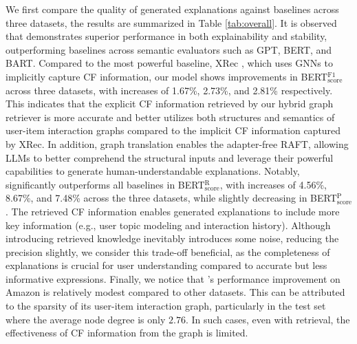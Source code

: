 We first compare the quality of generated explanations against baselines across three datasets, the results are summarized in Table \ref{tab:overall}. It is observed that \model demonstrates superior performance in both explainability and stability, outperforming baselines across semantic evaluators such as GPT, BERT, and BART. Compared to the most powerful baseline, XRec \cite{ma2024xrec}, which uses GNNs to implicitly capture CF information, our model shows improvements in BERT${_\text{score}^\text{F1}}$ across three datasets, with increases of 1.67\%, 2.73\%, and 2.81\% respectively. This indicates that the explicit CF information retrieved by our hybrid graph retriever is more accurate and better utilizes both structures and semantics of user-item interaction graphs compared to the implicit CF information captured by XRec. In addition, graph translation enables the adapter-free RAFT, allowing LLMs to better comprehend the structural inputs and leverage their powerful capabilities to generate human-understandable explanations. Notably, \model significantly outperforms all baselines in BERT${_\text{score}^\text{R}}$, with increases of 4.56\%, 8.67\%, and 7.48\% across the three datasets, while slightly decreasing in BERT${_\text{score}^\text{P}}$. The retrieved CF information enables generated explanations to include more key information (e.g., user topic modeling and interaction history). Although introducing retrieved knowledge inevitably introduces some noise, reducing the precision slightly, we consider this trade-off beneficial, as the completeness of explanations is crucial for user understanding compared to accurate but less informative expressions. Finally, we notice that \model's performance improvement on Amazon is relatively modest compared to other datasets. This can be attributed to the sparsity of its user-item interaction graph, particularly in the test set where the average node degree is only $2.76$. In such cases, even with retrieval, the effectiveness of CF information from the graph is limited. 



